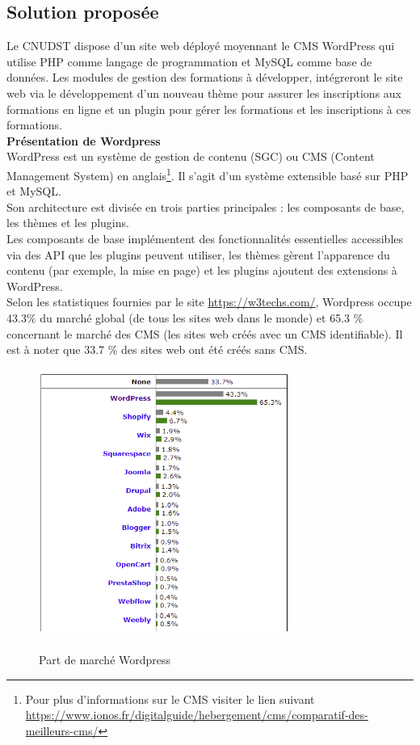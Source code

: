\subsection{Solution proposée}
Le CNUDST dispose d’un site web déployé moyennant le CMS WordPress qui utilise PHP comme langage de programmation et MySQL comme base de données. Les modules de gestion des formations à développer, intégreront le site web via le développement d’un nouveau thème pour assurer les inscriptions aux formations en ligne et un plugin pour gérer les formations et les inscriptions à ces formations.\\
\textbf{Présentation de Wordpress}\\
WordPress est un système de gestion de contenu (SGC) ou CMS (Content Management System) en anglais\footnote{Pour plus d’informations sur le CMS visiter le lien suivant \url{https://www.ionos.fr/digitalguide/hebergement/cms/comparatif-des-meilleurs-cms/} }. Il s’agit d’un système extensible basé sur PHP et MySQL.\\Son architecture est divisée en trois parties principales : les composants de base, les thèmes et les plugins.\\Les composants de base implémentent des fonctionnalités essentielles accessibles via des API que les plugins peuvent utiliser, les thèmes gèrent l'apparence du contenu (par exemple, la mise en page) et les plugins ajoutent des extensions à WordPress.\\
Selon les statistiques fournies par le site \url{https://w3techs.com/}, Wordpress occupe 43.3$\%$ du marché global (de tous les sites web dans le monde) et 65.3 $\%$ concernant le marché des CMS (les sites web créés avec un CMS identifiable). Il est à noter que 33.7 $\%$ des sites web ont été créés sans CMS.
\newpage
\begin{figure}[!h]
	\centering
	{\includegraphics[width=0.75\textwidth]{D) IMAGES/cmsMarche.png}}
	\caption{Part de marché Wordpress}
	\label{CMSWordPress}
\end{figure}

